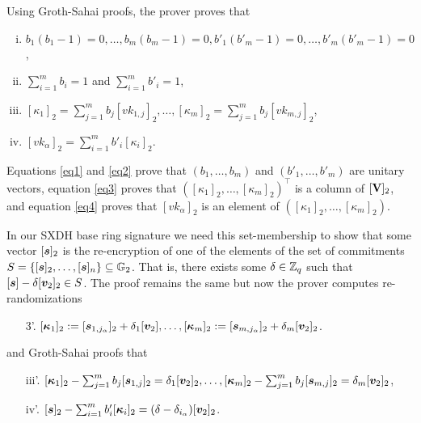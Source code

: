 Using Groth-Sahai proofs, the prover proves that
\begin{enumerate}[i.]
\item $b_1(b_1-1)=0,\ldots,b_m(b_m-1)=0,b'_1(b'_m-1)=0,\ldots,b'_m(b'_m-1)=0$,\label{eq1}
\item $\sum_{i=1}^m b_i =1$ and $\sum_{i=1}^m b'_i=1$,\label{eq2}
\item $[\kappa_1]_2=\sum_{j=1}^m b_j [vk_{1,j}]_2,\ldots,[\kappa_m]_2=\sum_{j=1}^m b_j[vk_{m,j}]_2$,\label{eq3}
\item $[vk_\alpha]_2=\sum_{i=1}^m b'_i[\kappa_i]_2$.\label{eq4}
\end{enumerate}
Equations \ref{eq1} and \ref{eq2} prove that $(b_1,\ldots,b_m)$ and $(b'_1,\ldots,b'_m)$ are unitary vectors, equation \ref{eq3} proves that $([\kappa_1]_2,\ldots,[\kappa_m]_2)^\top$ is a column of $[\mathbf{{V}}]_2$, and equation \ref{eq4} proves that $[vk_\alpha]_2$ is an element of $([\kappa_1]_2,\ldots,[\kappa_m]_2)$.

In our SXDH base ring signature we need this set-membership to show that some vector $[{\boldsymbol{s}}]_2$ is the re-encryption of one of the elements of the set of commitments $S = \{[{\boldsymbol{s}}]_2,\ldots,[{\boldsymbol{s}}]_n\}\subseteq\mathbb{G}_2$. That is, there exists some $\delta\in\mathbb{Z}_q$ such that $[{\boldsymbol{s}}]-\delta[{\boldsymbol{v}}_2]_2\in S$. The proof remains the same but now
the prover computes re-randomizations
\begin{enumerate}[1.']
\setcounter{enumi}{2}
\item[3'.] $[{\boldsymbol{\kappa}}_1]_2:=[{\boldsymbol{s}}_{1,j_\alpha}]_2+\delta_1[{\boldsymbol{v}}_2],\ldots,[{\boldsymbol{\kappa}}_m]_2:=[{\boldsymbol{s}}_{m,j_\alpha}]_2+\delta_m[{\boldsymbol{v}}_2]_2$.
\end{enumerate}
and Groth-Sahai proofs that
\begin{enumerate}[i.']
\setcounter{enumi}{2}
\item[iii'.] $[{\boldsymbol{\kappa}}_1]_2 - \sum_{j=1}^m b_j [{\boldsymbol{s}}_{1,j}]_2 = \delta_1[{\boldsymbol{v}}_2]_2,\ldots,[{\boldsymbol{\kappa}}_m]_2-\sum_{j=1}^m b_j[{\boldsymbol{s}}_{m,j}]_2 = \delta_m[{\boldsymbol{v}}_2]_2$,\label{eq3}
\item[iv'.] $[{\boldsymbol{s}}]_2 - \sum_{i=1}^m b'_i[{\boldsymbol{\kappa}}_i]_2  = (\delta-\delta_{i_\alpha})[{\boldsymbol{v}}_2]_2$.\label{eq4}
\end{enumerate}